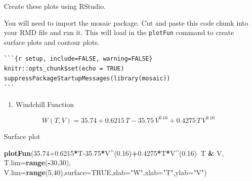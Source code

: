 \documentclass[
]{book}
\newenvironment{Shaded}{\begin{snugshade}}{\end{snugshade}}
\newcommand{\DataTypeTok}[1]{\textcolor[rgb]{0.13,0.29,0.53}{#1}}
\newcommand{\DecValTok}[1]{\textcolor[rgb]{0.00,0.00,0.81}{#1}}
\newcommand{\FloatTok}[1]{\textcolor[rgb]{0.00,0.00,0.81}{#1}}
\newcommand{\KeywordTok}[1]{\textcolor[rgb]{0.13,0.29,0.53}{\textbf{#1}}}
\newcommand{\NormalTok}[1]{#1}
\newcommand{\OperatorTok}[1]{\textcolor[rgb]{0.81,0.36,0.00}{\textbf{#1}}}
\newcommand{\OtherTok}[1]{\textcolor[rgb]{0.56,0.35,0.01}{#1}}
\newcommand{\StringTok}[1]{\textcolor[rgb]{0.31,0.60,0.02}{#1}}
\providecommand{\tightlist}{%
  \setlength{\itemsep}{0pt}\setlength{\parskip}{0pt}}
\begin{document}
Create these plots using RStudio.

You will need to import the mosaic package. Cut and paste this code chunk into your RMD file and run it. This will load in the \texttt{plotFun} command to create surface plots and contour plots.

\begin{verbatim}
```{r setup, include=FALSE, warning=FALSE}
knitr::opts_chunk$set(echo = TRUE)
suppressPackageStartupMessages(library(mosaic))
```
\end{verbatim}

\begin{enumerate}
\def\labelenumi{\arabic{enumi}.}
\tightlist
\item
  Windchill Function
\end{enumerate}

\[
W(T,V) = 35.74+0.6215 \, T-35.75 \, V^{0.16}+0.4275 \, T \,  V^{0.16}
\]

Surface plot

\begin{Shaded}
\begin{Highlighting}[]
\KeywordTok{plotFun}\NormalTok{(}\FloatTok{35.74+0.6215}\OperatorTok{*}\NormalTok{T}\FloatTok{-35.75}\OperatorTok{*}\NormalTok{V}\OperatorTok{^}\NormalTok{(}\FloatTok{0.16}\NormalTok{)}\OperatorTok{+}\FloatTok{0.4275}\OperatorTok{*}\NormalTok{T}\OperatorTok{*}\NormalTok{V}\OperatorTok{^}\NormalTok{(}\FloatTok{0.16}\NormalTok{)}\OperatorTok{~}\NormalTok{T }\OperatorTok{&}\StringTok{ }\NormalTok{V, }\DataTypeTok{T.lim=}\KeywordTok{range}\NormalTok{(}\OperatorTok{-}\DecValTok{30}\NormalTok{,}\DecValTok{30}\NormalTok{),}
\DataTypeTok{V.lim=}\KeywordTok{range}\NormalTok{(}\DecValTok{5}\NormalTok{,}\DecValTok{40}\NormalTok{),}\DataTypeTok{surface=}\OtherTok{TRUE}\NormalTok{,}\DataTypeTok{zlab=}\StringTok{"W"}\NormalTok{,}\DataTypeTok{xlab=}\StringTok{"T"}\NormalTok{,}\DataTypeTok{ylab=}\StringTok{"V"}\NormalTok{)}
\end{Highlighting}
\end{Shaded}
\end{document}
